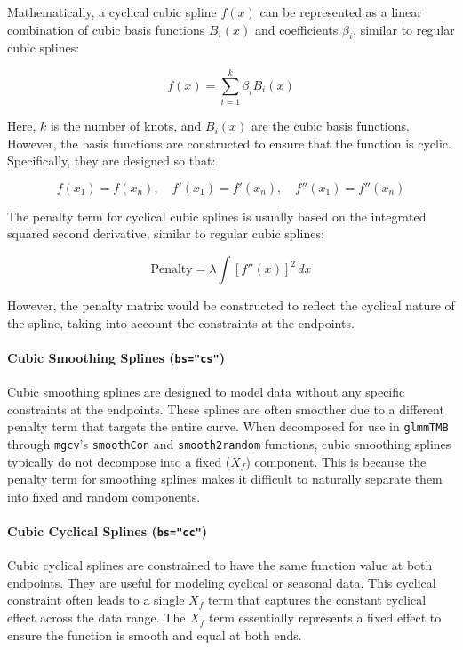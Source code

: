 \documentclass[12pt, twoside,hidelinks]{article}
\theoremstyle{definition}
\numberwithin{equation}{section}
\begin{document}
Mathematically, a cyclical cubic spline \( f(x) \) can be represented as a linear combination of cubic basis functions \( B_i(x) \) and coefficients \( \beta_i \), similar to regular cubic splines:

\[
f(x) = \sum_{i=1}^{k} \beta_i B_i(x)
\]

Here, \( k \) is the number of knots, and \( B_i(x) \) are the cubic basis functions. However, the basis functions are constructed to ensure that the function is cyclic. Specifically, they are designed so that:

\[
f(x_1) = f(x_n), \quad f'(x_1) = f'(x_n), \quad f''(x_1) = f''(x_n)
\]



The penalty term for cyclical cubic splines is usually based on the integrated squared second derivative, similar to regular cubic splines:

\[
\text{Penalty} = \lambda \int [f''(x)]^2 \, dx
\]

However, the penalty matrix would be constructed to reflect the cyclical nature of the spline, taking into account the constraints at the endpoints.


\paragraph{Cubic Smoothing Splines (\texttt{bs="cs"})}

Cubic smoothing splines are designed to model data without any specific constraints at the endpoints. These splines are often smoother due to a different penalty term that targets the entire curve. When decomposed for use in \texttt{glmmTMB} through \texttt{mgcv}'s \texttt{smoothCon} and \texttt{smooth2random} functions, cubic smoothing splines typically do not decompose into a fixed (\(X_f\)) component. This is because the penalty term for smoothing splines makes it difficult to naturally separate them into fixed and random components.

\paragraph{Cubic Cyclical Splines (\texttt{bs="cc"})}

Cubic cyclical splines are constrained to have the same function value at both endpoints. They are useful for modeling cyclical or seasonal data. This cyclical constraint often leads to a single \(X_f\) term that captures the constant cyclical effect across the data range. The \(X_f\) term essentially represents a fixed effect to ensure the function is smooth and equal at both ends.
\end{document}
